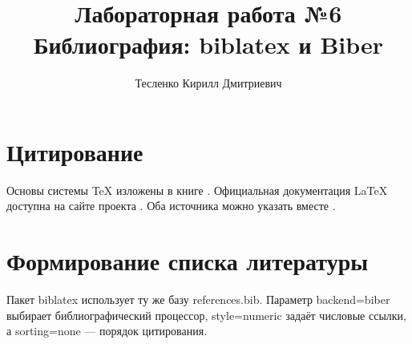 \documentclass[a4paper,12pt]{article}
\title{Лабораторная работа №6\\Библиография: biblatex и Biber}
\author{Тесленко Кирилл Дмитриевич}
\date{}
\begin{document}
\maketitle
\section{Цитирование}
Основы системы TeX изложены в книге \textcite{knuth1984texbook}.
Официальная документация LaTeX доступна на сайте проекта \parencite{latexproject}.
Оба источника можно указать вместе \cite{knuth1984texbook,latexproject}.

\section{Формирование списка литературы}
Пакет biblatex использует ту же базу references.bib.
Параметр backend=biber выбирает библиографический процессор,
style=numeric задаёт числовые ссылки, а sorting=none --- порядок цитирования.
\printbibliography[title={Список литературы}]
\end{document}
